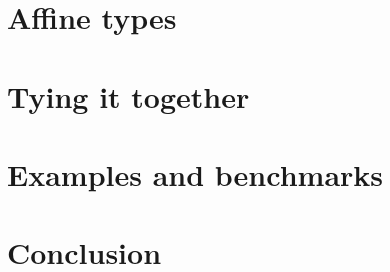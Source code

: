 \documentclass{article}
\begin{document}
\section{Affine types}
\label{sec:affine_types}

\section{Tying it together}
\label{sec:tying_it_together}

\section{Examples and benchmarks}
\label{sec:examples_and_benchmarks}

\section{Conclusion}
\label{sec:conclusion}



\end{document}
